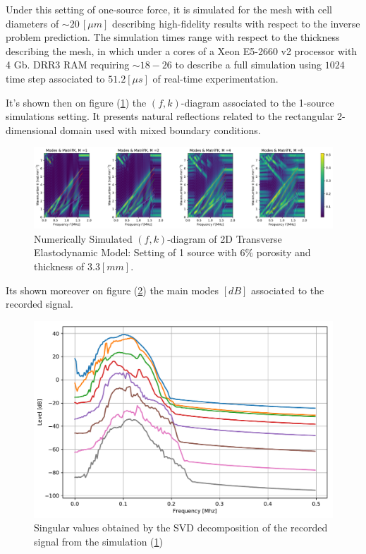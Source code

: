 \begin{rem}
Under this setting of one-source force, it is simulated for the mesh with cell diameters of $\sim 20 \, [\mu m]$ describing high-fidelity results with respect to the inverse problem prediction. The simulation times range with respect to the thickness describing the mesh, in which under a cores of a Xeon E5-2660 v2 processor with 4 Gb. DRR3 RAM requiring $\sim 18-26$ to describe a full simulation using $1024$ time step associated to $51.2 [\mu s]$ of real-time experimentation.
\end{rem}
It's shown then on figure (\ref{FK-DiagramS1P6M33}) the $(f,k)$-diagram associated to the 1-source simulations setting. It presents natural reflections related to the rectangular 2-dimensional domain used with mixed boundary conditions.
\begin{figure}[!h]
	\centering
	\includegraphics[width=\textwidth]{images/TimeSingSous/2DTime_P6ElasticFK33M1460_y.pdf}
	\caption{Numerically Simulated $(f,k)$-diagram of 2D Transverse Elastodynamic Model: Setting of 1 source with $6\%$ porosity and thickness of $3.3 [mm]$.}
	\label{FK-DiagramS1P6M33}
\end{figure}

Its shown moreover on figure (\ref{SVD-S1P6M33}) the main modes $[dB]$ associated to the recorded signal.
\begin{figure}[!h]
	\centering
	\includegraphics[scale=.5]{images/TimeSingSous/2DTime_P6Elastic33_SV.pdf}
	\caption{Singular values obtained by the SVD decomposition of the recorded signal from the simulation (\ref{FK-DiagramS1P6M33})}
	\label{SVD-S1P6M33}
\end{figure}

